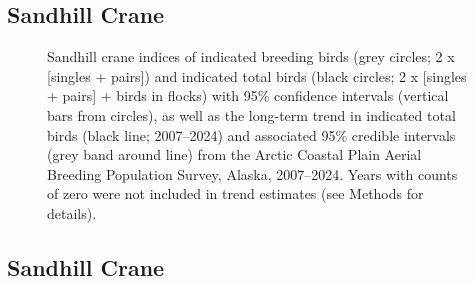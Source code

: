 \documentclass[
]{article}
\begin{document}
\newpage{}

\subsection*{Sandhill Crane}\label{sandhill-crane}

\begin{figure}


\caption{\label{fig-SACR}Sandhill crane indices of indicated breeding
birds (grey circles; 2 x {[}singles + pairs{]}) and indicated total
birds (black circles; 2 x {[}singles + pairs{]} + birds in flocks) with
95\% confidence intervals (vertical bars from circles), as well as the
long-term trend in indicated total birds (black line; 2007--2024) and
associated 95\% credible intervals (grey band around line) from the
Arctic Coastal Plain Aerial Breeding Population Survey, Alaska,
2007--2024. Years with counts of zero were not included in trend
estimates (see Methods for details).}

\end{figure}%

\newpage{}

\subsection*{Sandhill Crane}\label{sandhill-crane-1}

\begingroup\fontsize{10}{12}\selectfont
\end{document}

